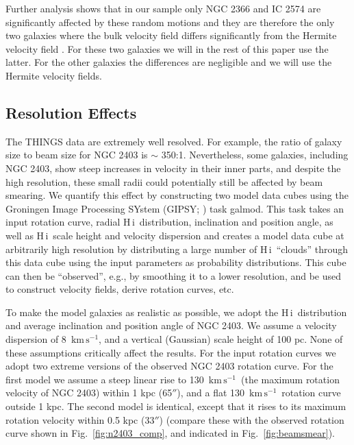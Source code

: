 \documentclass[usenatbib,usegraphicx,apjfonts,floatfix]{emulateapj}
\newcommand{\kms}{\ensuremath{\,\mbox{km}\,\mbox{s}^{-1}}}
\newcommand{\HI}{H\,{\sc i}}
\begin{document}
Further analysis shows that in our sample only NGC 2366 and IC 2574
are significantly affected by these random motions and they are
therefore the only two galaxies where the bulk velocity field differs
significantly from the Hermite velocity field \citep{oh2007}. For
these two galaxies we will in the rest of this paper use the latter.
For the other galaxies the differences are negligible and 
we will use the Hermite velocity fields.

\subsection{Resolution Effects\label{beamsmear}}

The THINGS data are extremely well resolved. For example, the ratio of
galaxy size to beam size for NGC 2403 is $\sim$ 350:1. Nevertheless,
some galaxies, including NGC 2403, show steep increases in velocity in
their inner parts, and despite the high resolution, these small radii
could potentially still be affected by beam smearing.  We quantify
this effect by constructing two model data cubes using the Groningen
Image Processing SYstem (GIPSY; \citealt{gipsy}) task {\sc
  galmod}. This task takes an input rotation curve, radial \HI\
distribution, inclination and position angle, as well as \HI{}ale
height and velocity dispersion and creates a model data cube at
arbitrarily high resolution by distributing a large number of \HI\
``clouds'' through this data cube using the input parameters as
probability distributions. This cube can then be ``observed'', e.g.,
by smoothing it to a lower resolution, and be used to construct
velocity fields, derive rotation curves, etc.

To make the model galaxies as realistic as possible, we adopt the \HI\
distribution and average inclination and position angle of NGC
2403. We assume a velocity dispersion of 8 \kms, and a vertical
(Gaussian) scale height of 100 pc. None of these assumptions
critically affect the results. For the input rotation curves we adopt
two extreme versions of the observed NGC 2403 rotation curve. For the
first model we assume a steep linear rise to 130 \kms\ (the maximum
rotation velocity of NGC 2403) within 1 kpc (65$''$), and a flat 130
\kms\ rotation curve outside 1 kpc. The second model is identical,
except that it rises to its maximum rotation velocity within 0.5 kpc
(33$''$) (compare these with the observed rotation curve shown in
Fig.~\ref{fig:n2403_comp}, and indicated in Fig.~\ref{fig:beamsmear}).
\end{document}
